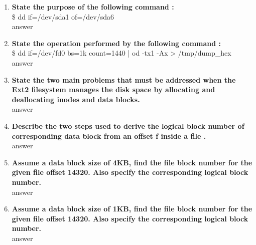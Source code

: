 \documentclass[a4paper,12pt]{article}
\begin{document}
\begin{flushleft}
\begin{enumerate}
{Compute the following:}\\
a) Total number of blocks in the floppy disk considering its size.\\
{\color{red}answer}\\
b) Total number of reserved blocks\\
{\color{red}answer}\\
c) Number of Block group descriptors\\
{\color{red}answer}\\
d) Number of inodes in the inode table\\
{\color{red}answer}\\
e) Size of inode table in terms of blocks\\
{\color{red}answer}\\
\item \textbf{ State the purpose of the following command :}\\
\$ dd if=/dev/sda1 of=/dev/sda6\\
{\color{red}answer}\\
\item \textbf{ State the operation performed by the following command :}\\
\$ dd if=/dev/fd0 bs=1k count=1440 | od -tx1 -Ax > /tmp/dump\_hex\\
{\color{red}answer}\\
\item \textbf{ State the two main problems that must be addressed when the Ext2 filesystem manages the disk space by allocating and deallocating inodes and data blocks.}\\
{\color{red}answer}\\
\item \textbf{ Describe the two steps used to derive the logical block number of corresponding data block from an offset f inside a file .}\\
{\color{red}answer}\\
\item \textbf{ Assume a data block size of 4KB, find the file block number for the given file offset 14320. Also specify the corresponding logical block number.}\\
{\color{red}answer}\\
\item \textbf{ Assume a data block size of 1KB, find the file block number for the given file offset 14320. Also specify the corresponding logical block number.}\\
{\color{red}answer}\\

\end{enumerate}
\end{flushleft}
\end{document}
